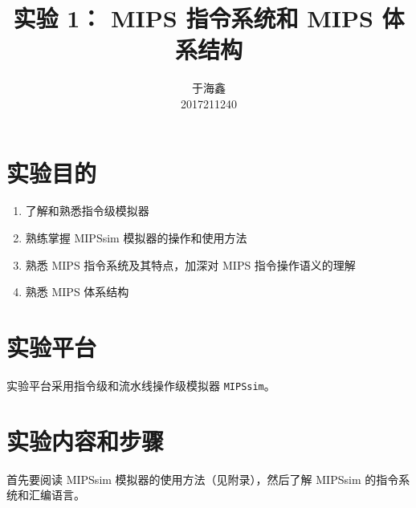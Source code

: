 \documentclass[blue,normal,cn]{elegantnote}
\title{实验 1： MIPS 指令系统和 MIPS 体系结构}
\date{\zhtoday}
\newcommand{\code}[1]{\colorbox{light-gray}{\texttt{#1}}}
\begin{document}
\author{
    \begin{tabular}[t]{c}
        于海鑫 \\
        2017211240
    \end{tabular}
}
\maketitle

\section{实验目的}
\begin{enumerate}
    \item 了解和熟悉指令级模拟器
    \item 熟练掌握 MIPSsim 模拟器的操作和使用方法
    \item 熟悉 MIPS 指令系统及其特点，加深对 MIPS 指令操作语义的理解
    \item 熟悉 MIPS 体系结构
\end{enumerate}

\section{实验平台}

实验平台采用指令级和流水线操作级模拟器 \code{MIPSsim}。

\section{实验内容和步骤}

首先要阅读 MIPSsim 模拟器的使用方法（见附录），然后了解 MIPSsim 的指令系统和汇编语言。
\end{document}
